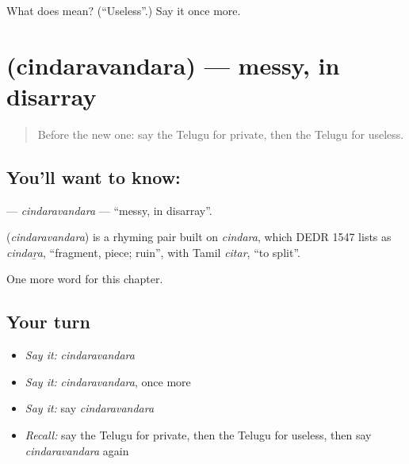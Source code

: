 \begin{tcolorbox}[breakable,colback=teal!4,colframe=teal!35!black,title={Before you move on}]
What does  mean? (\textquotedblleft{}Useless\textquotedblright{}.) Say it once more.
\end{tcolorbox}
\section[\texorpdfstring{\te{చిందరవందర} (cindaravandara)}{చిందరవందర (cindaravandara)}]{ (cindaravandara) — messy, in disarray}

\label{lesson:TE-C223-cindaravandara}



\begin{quote}
Before the new one: say the Telugu for private, then the Telugu for useless.
\end{quote}

\subsection*{You'll want to know: }
\textbf{} — \emph{cindaravandara} — \textquotedblleft{}messy, in disarray\textquotedblright{}.

\begin{cousinweb}
\textbf{} (\emph{cindaravandara}) is a rhyming pair built on \emph{cindara}, which DEDR 1547 lists as \emph{cindaṟa}, \textquotedblleft{}fragment, piece; ruin\textquotedblright{}, with Tamil \emph{citar}, \textquotedblleft{}to split\textquotedblright{}.
\end{cousinweb}

\begin{grammarlens}[title={What you've built}]
One more word for this chapter.
\end{grammarlens}

\subsection*{Your turn}
\begin{itemize}
\raggedright
  \item \emph{Say it:} \emph{cindaravandara}
  \item \emph{Say it:} \emph{cindaravandara}, once more
  \item \emph{Say it:} say \emph{cindaravandara}
  \item \emph{Recall:} say the Telugu for private, then the Telugu for useless, then say \emph{cindaravandara} again
\end{itemize}

